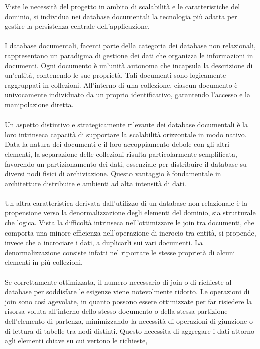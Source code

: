 Viste le necessità del progetto in ambito di scalabilità
e le caratteristiche del dominio,
si individua nei database documentali la tecnologia più adatta
per gestire la persistenza centrale dell'applicazione.\\
\\
I database documentali, facenti parte della categoria dei database non relazionali,
rappresentano un paradigma di gestione dei dati
che organizza le informazioni in documenti.
Ogni documento è un'unità autonoma che incapsula la descrizione di un'entità,
contenendo le sue proprietà.
Tali documenti sono logicamente raggruppati in collezioni.
All'interno di una collezione,
ciascun documento è univocamente individuato da un proprio identificativo,
garantendo l'accesso e la manipolazione diretta.\\
\\
Un aspetto distintivo e strategicamente rilevante dei database documentali è
la loro intrinseca capacità di supportare la scalabilità orizzontale in modo nativo.
Data la natura dei documenti e il loro accoppiamento debole con gli altri elementi,
la separazione delle collezioni risulta particolarmente semplificata,
favorendo un partizionamento dei dati,
essenziale per distribuire il database su diversi nodi fisici di archiviazione.
Questo vantaggio è fondamentale in architetture distribuite e ambienti ad alta intensità di dati.\\
\\
Un altra caratteristica derivata dall'utilizzo di un database non relazionale
è la propensione verso la denormalizzazione degli elementi del dominio,
sia strutturale che logica.
Vista la difficoltà intrinseca nell'ottimizzare le join tra documenti,
che comporta una minore efficienza nell'operazione di incrocio tra entità,
si propende, invece che a incrociare i dati, a duplicarli sui vari documenti.
La denormalizzazione consiste infatti nel riportare 
le stesse proprietà di alcuni elementi in più collezioni.\\
\\
Se correttamente ottimizzata, 
il numero necessario di join o di richieste al database 
per soddisfare le esigenze viene notevolmente ridotto.
Le operazioni di join sono così agevolate,
in quanto possono essere ottimizzate per
far risiedere la risorsa voluta all'interno dello stesso documento 
o della stessa partizione dell'elemento di partenza,
minimizzando la necessità di operazioni di giunzione o di lettura di tabelle tra nodi distinti.
Questo necessita di aggregare i dati attorno agli elementi chiave su cui vertono le richieste,
